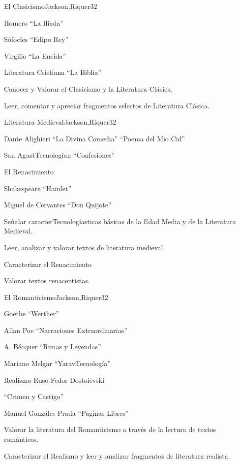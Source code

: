 \begin{syllabus}
\begin{unit}{El Clasicismo}{Jackson,Riquer}{3}{2}
\begin{topics}
	\item Homero ``La Iliada''
	\item Sófocles ``Edipo Rey''
	\item Virgilio ``La Eneida''
	\item Literatura Cristiana ``La Biblia''
\end{topics}
\begin{learningoutcomes}
	\item Conocer y Valorar el Clasicismo y la Literatura Clásica.
	\item Leer, comentar y apreciar fragmentos selectos de Literatura Clásica.
\end{learningoutcomes}
\end{unit}
\begin{unit}{Literatura Medieval}{Jackson,Riquer}{3}{2}
\begin{topics}
	\item Dante Alighieri ``La Divina Comedia'' ``Poema del Mio Cid''
	\item    San AgustTecnologían ``Confesiones''  
	\item    El Renacimiento
	\item    Shakespeare ``Hamlet''
	\item    Miguel de Cervantes ``Don Quijote''
\end{topics}
\begin{learningoutcomes}
	\item Señalar caracterTecnologíasticas básicas de la Edad Media y de la Literatura Medieval.
	\item Leer, analizar y valorar textos de literatura medieval.
	\item Caracterizar el Renacimiento
	\item Valorar textos renacentistas.
\end{learningoutcomes}
\end{unit}

\begin{unit}{El Romanticismo}{Jackson,Riquer}{3}{2}
\begin{topics}
	\item Goethe ``Werther''
	\item Allan Poe ``Narraciones Extraordinarias''
	\item A. Bécquer ``Rimas y Leyendas''
	\item Mariano Melgar ``YaravTecnología''
	\item Realismo Ruso Fedor Dostoievski 
	\item ``Crimen y Castigo''
	\item Manuel Gonzáles Prada ``Paginas Libres''
\end{topics}
\begin{learningoutcomes}
	\item Valorar la literatura del Romanticismo a través de la lectura de textos románticos.
	\item Caracterizar el Realismo y leer y analizar fragmentos de literatura realista.
\end{learningoutcomes}
\end{unit}


\end{syllabus}
